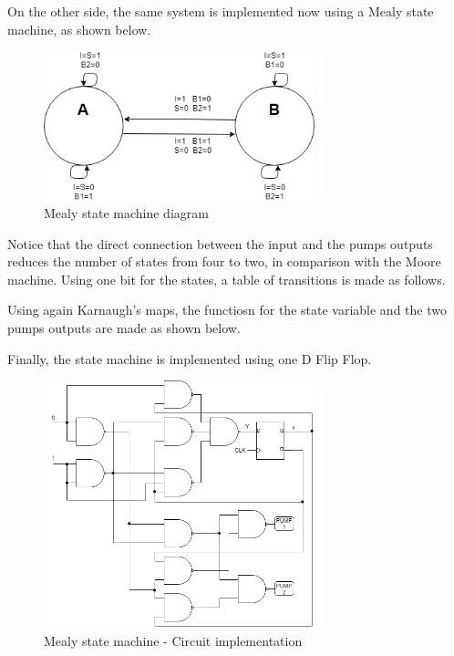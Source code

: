 On the other side, the same system is implemented 
now using a Mealy state machine, as shown below.

\begin{figure}[H]
    \begin{centering}
    \includegraphics[width=0.7\textwidth]{Graficos1/1b_fsm.png}
    \par\end{centering}
    \caption{Mealy state machine diagram}
\end{figure}

Notice that the direct connection between the 
input and the pumps outputs reduces the number 
of states from four to two, in comparison with 
the Moore machine.
Using one bit for the states, a table of transitions
is made as follows.


Using again Karnaugh's maps, the functiosn for
the state variable and the two pumps outputs are
made as shown below.


Finally, the state machine is implemented using
one D Flip Flop.

\begin{figure}[H]
    \begin{centering}
    \includegraphics[width=0.7\textwidth]{Graficos1/1b_Compuertas_Mealy.png}
    \par\end{centering}
    \caption{Mealy state machine - Circuit implementation}
\end{figure}

